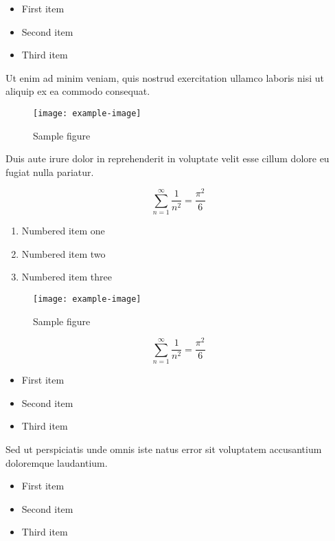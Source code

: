 \documentclass{article}
\begin{document}
\begin{itemize}
\item First item
\item Second item
\item Third item
\end{itemize}

Ut enim ad minim veniam, quis nostrud exercitation ullamco laboris nisi ut aliquip ex ea commodo consequat.

\begin{figure}[h]
    \centering
    \texttt{[image: example-image]}
    \caption{Sample figure}
    \label{fig:sample}
\end{figure}

Duis aute irure dolor in reprehenderit in voluptate velit esse cillum dolore eu fugiat nulla pariatur.

\begin{equation}
    \sum_{n=1}^{\infty} \frac{1}{n^2} = \frac{\pi^2}{6}
\end{equation}

\begin{enumerate}
\item Numbered item one
\item Numbered item two
\item Numbered item three
\end{enumerate}

\begin{figure}[h]
    \centering
    \texttt{[image: example-image]}
    \caption{Sample figure}
    \label{fig:sample}
\end{figure}

\begin{equation}
    \sum_{n=1}^{\infty} \frac{1}{n^2} = \frac{\pi^2}{6}
\end{equation}

\begin{itemize}
\item First item
\item Second item
\item Third item
\end{itemize}

Sed ut perspiciatis unde omnis iste natus error sit voluptatem accusantium doloremque laudantium.


\begin{itemize}
\item First item
\item Second item
\item Third item
\end{itemize}
\end{document}
